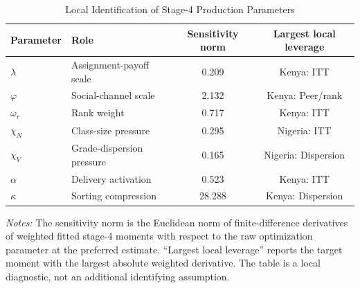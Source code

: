 \begin{table}[H]
\centering
\caption{Local Identification of Stage-4 Production Parameters}
\label{tab:struct_local_identification}
\begin{threeparttable}
\begin{tabular}[t]{llcc}
\toprule
Parameter & Role & Sensitivity norm & Largest local leverage \\
\midrule
$\lambda$ & Assignment-payoff scale & 0.209 & Kenya: ITT \\
$\varphi$ & Social-channel scale & 2.132 & Kenya: Peer/rank \\
$\omega_r$ & Rank weight & 0.717 & Kenya: ITT \\
$\chi_N$ & Class-size pressure & 0.295 & Nigeria: ITT \\
$\chi_V$ & Grade-dispersion pressure & 0.165 & Nigeria: Dispersion \\
$\alpha$ & Delivery activation & 0.523 & Kenya: ITT \\
$\kappa$ & Sorting compression & 28.288 & Kenya: Dispersion \\
\bottomrule
\end{tabular}
\begin{tablenotes}
\footnotesize
\item \textit{Notes:} The sensitivity norm is the Euclidean norm of finite-difference derivatives of weighted fitted stage-4 moments with respect to the raw optimization parameter at the preferred estimate. ``Largest local leverage'' reports the target moment with the largest absolute weighted derivative. The table is a local diagnostic, not an additional identifying assumption.
\end{tablenotes}
\end{threeparttable}
\end{table}
